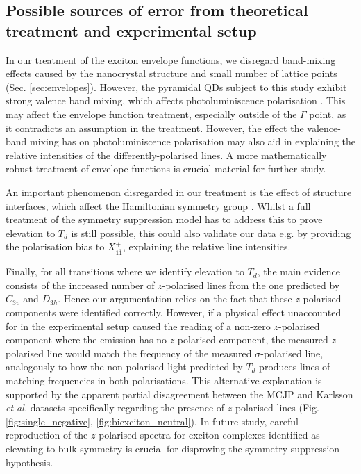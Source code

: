 \subsection{Possible sources of error from theoretical treatment and experimental setup}

In our treatment of the exciton envelope functions, we disregard band-mixing effects caused by the nanocrystal structure and small number of lattice points (Sec. \ref{sec:envelopes}). However, the pyramidal QDs subject to this study exhibit strong valence band mixing, which affects photoluminiscence polarisation \cite{strong_band_mixing}. This may affect the envelope function treatment, especially outside of the $\Gamma$ point, as it contradicts an assumption in the treatment. However, the effect the valence-band mixing has on photoluminiscence polarisation may also aid in explaining the relative intensities of the differently-polarised lines. A more mathematically robust treatment of envelope functions is crucial material for further study.

An important phenomenon disregarded in our treatment is the effect of structure interfaces, which affect the Hamiltonian symmetry group \cite{interfaces}. Whilst a full treatment of the symmetry suppression model has to address this to prove elevation to $T_d$ is still possible, this could also validate our data e.g. by providing the polarisation bias to $X^+_{1\bar{1}}$, explaining the relative line intensities.

Finally, for all transitions where we identify elevation to $T_d$, the main evidence consists of the increased number of $z$-polarised lines from the one predicted by $C_{3v}$ and $D_{3h}$. Hence our argumentation relies on the fact that these $z$-polarised components were identified correctly. However, if a physical effect unaccounted for in the experimental setup caused the reading of a non-zero $z$-polarised component where the emission has no $z$-polarised component, the measured $z$-polarised line would match the frequency of the measured $\sigma$-polarised line, analogously to how the non-polarised light predicted by $T_d$ produces lines of matching frequencies in both polarisations. This alternative explanation is supported by the apparent partial disagreement between the MCJP and Karlsson \textit{et al.} datasets specifically regarding the presence of $z$-polarised lines (Fig. \ref{fig:single_negative}, \ref{fig:biexciton_neutral}). In future study, careful reproduction of the $z$-polarised spectra for exciton complexes identified as elevating to bulk symmetry is crucial for disproving the symmetry suppression hypothesis.

